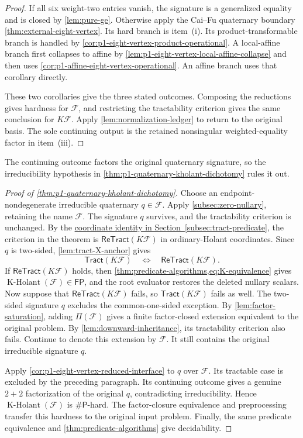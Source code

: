 \documentclass[11pt,letterpaper,onecolumn]{article}
\theoremstyle{plain}
\theoremstyle{definition}
\theoremstyle{remark}
\newcommand{\cF}{\mathcal F}
\newcommand{\KHolant}{\operatorname{K\text{-}Holant}}
\newcommand{\Tract}{\mathsf{Tract}}
\newcommand{\ReTract}{\mathsf{ReTract}}
\newcommand{\FP}{\mathsf{FP}}
\newcommand{\SharpP}{\#\mathsf P}
\begin{document}
\begin{proof}
If all six weight-two entries vanish, the signature is a generalized
equality and is closed by
\cref{lem:pure-ge}.  Otherwise apply the Cai--Fu quaternary boundary
\cref{thm:external-eight-vertex}.  Its hard branch is item~(i).  Its
product-transformable branch is handled by
\cref{cor:p1-eight-vertex-product-operational}.  A local-affine branch first
collapses to affine by \cref{lem:p1-eight-vertex-local-affine-collapse} and then
uses \cref{cor:p1-affine-eight-vertex-operational}. An affine branch uses that corollary directly.

These two corollaries give the three stated outcomes.
Composing the reductions gives hardness for \(\cF\), and restricting the
tractability criterion gives the same conclusion for \(K\cF\).  Apply
\cref{lem:normalization-ledger} to return to the original basis.
The sole continuing output is the retained nonsingular weighted-equality
factor in item~(iii).
\end{proof}

The continuing outcome factors the original quaternary signature, so the
irreducibility hypothesis in \cref{thm:p1-quaternary-kholant-dichotomy} rules it out.

\begin{proof}[Proof of \cref{thm:p1-quaternary-kholant-dichotomy}]
Choose an endpoint-nondegenerate irreducible quaternary
\(q\in\cF\).  Apply \cref{subsec:zero-nullary}, retaining the name \(\cF\).
The signature \(q\) survives, and the tractability criterion is unchanged.
By the \hyperlink{eq:retract-K-coordinates}{coordinate identity in
Section~\ref{subsec:tract-predicate}}, the criterion in the theorem is
\(\ReTract(K\cF)\) in ordinary-Holant coordinates.
Since \(q\) is two-sided, \cref{lem:tract-X-anchor} gives
\[
 \Tract(K\cF)\quad\Longleftrightarrow\quad\ReTract(K\cF).
\]
If \(\ReTract(K\cF)\) holds, then
\cref{thm:predicate-algorithms,eq:K-equivalence} gives
\(\KHolant(\cF)\in\FP\), and the root evaluator restores the deleted
nullary scalars. Now suppose that \(\ReTract(K\cF)\) fails, so
\(\Tract(K\cF)\) fails as well. The two-sided signature \(q\)
excludes the common-one-sided exception. By
\cref{lem:factor-saturation}, adding \(\Pi(\cF)\) gives a finite
factor-closed extension equivalent to the original problem. By
\cref{lem:downward-inheritance}, its tractability criterion also fails.
Continue to denote this extension by \(\cF\). It still contains the
original irreducible signature \(q\).

Apply \cref{cor:p1-eight-vertex-reduced-interface} to \(q\) over
\(\cF\).  Its tractable case is excluded by the preceding paragraph.
Its continuing outcome gives a genuine \(2+2\) factorization of the original
\(q\), contradicting irreducibility. Hence \(\KHolant(\cF)\) is
\(\SharpP\)-hard.
The factor-closure equivalence and preprocessing transfer this hardness
to the original input problem. Finally, the same predicate equivalence and
\cref{thm:predicate-algorithms} give decidability.
\end{proof}
\end{document}
